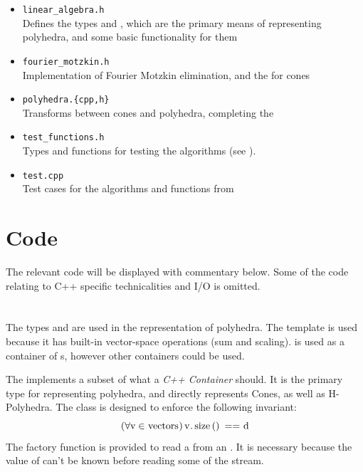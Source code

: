 \begin{itemize}
	\item \texttt{linear\_algebra.h} \\
	      Defines the types  and , which are the primary means of representing polyhedra, and some basic functionality for them
	\item \texttt{fourier\_motzkin.h} \\
	      Implementation of Fourier Motzkin elimination, and the {\MWT} for cones
	\item \texttt{polyhedra.\{cpp,h\} } \\
	      Transforms between cones and polyhedra, completing the {\MWT}
	\item \texttt{test\_functions.h} \\
	      Types and functions for testing the algorithms (see ).
	\item \texttt{test.cpp} \\
	      Test cases for the algorithms and functions from 
\end{itemize}

\section{Code}

The relevant code will be displayed with commentary below.  Some of the code relating to C{++} specific technicalities and I/O is omitted.

\section{}
The types  and  are used in the representation of polyhedra.  The  template is used because it has built-in vector-space operations (sum and scaling).   is used as a container of s, however other containers could be used.
\lsttdVecs

The  implements a subset of what a \textit{C++ Container} should.  It is the primary type for representing polyhedra, and directly represents Cones, as well as H-Polyhedra.  The class is designed to enforce the following invariant:
\[ (\forall \mli{v} \in \mli{vectors})\, \mli{v.size() == d} \]
The factory function  is provided to read a  from an .  It is necessary because the value of  can't be known before reading some of the stream.
\lstMatrix

